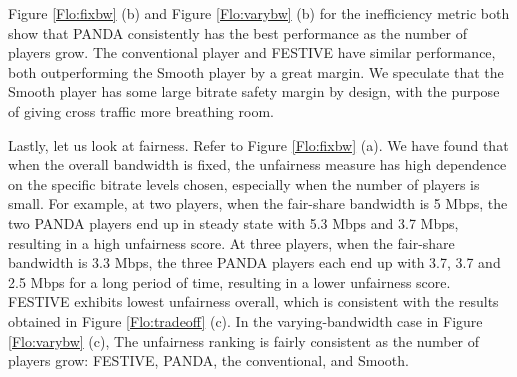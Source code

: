 \documentclass[conference]{IEEEtran}
\theoremstyle{plain}
\theoremstyle{definition}
\theoremstyle{plain}
\theoremstyle{plain}
\begin{document}
Figure \ref{Flo:fixbw} (b) and Figure \ref{Flo:varybw} (b) for the
inefficiency metric both show that PANDA consistently has the best
performance as the number of players grow. The conventional player
and FESTIVE have similar performance, both outperforming the Smooth
player by a great margin. We speculate that the Smooth player has
some large bitrate safety margin by design, with the purpose of giving
cross traffic more breathing room.

Lastly, let us look at fairness. Refer to Figure \ref{Flo:fixbw}
(a). We have found that when the overall bandwidth is fixed, the unfairness
measure has high dependence on the specific bitrate levels chosen,
especially when the number of players is small. For example, at two
players, when the fair-share bandwidth is 5 Mbps, the two PANDA players
end up in steady state with 5.3 Mbps and 3.7 Mbps, resulting in a
high unfairness score. At three players, when the fair-share bandwidth
is 3.3 Mbps, the three PANDA players each end up with 3.7, 3.7 and
2.5 Mbps for a long period of time, resulting in a lower unfairness
score. FESTIVE exhibits lowest unfairness overall, which is consistent
with the results obtained in Figure \ref{Flo:tradeoff} (c). In the
varying-bandwidth case in Figure \ref{Flo:varybw} (c), The unfairness
ranking is fairly consistent as the number of players grow: FESTIVE,
PANDA, the conventional, and Smooth.
\end{document}
